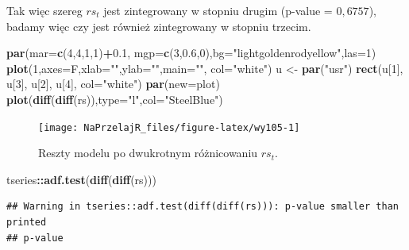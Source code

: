 \documentclass[polish,]{book}
\newenvironment{Shaded}{\begin{snugshade}}{\end{snugshade}}
\newcommand{\DataTypeTok}[1]{\textcolor[rgb]{0.13,0.29,0.53}{#1}}
\newcommand{\DecValTok}[1]{\textcolor[rgb]{0.00,0.00,0.81}{#1}}
\newcommand{\FloatTok}[1]{\textcolor[rgb]{0.00,0.00,0.81}{#1}}
\newcommand{\KeywordTok}[1]{\textcolor[rgb]{0.13,0.29,0.53}{\textbf{#1}}}
\newcommand{\NormalTok}[1]{#1}
\newcommand{\OperatorTok}[1]{\textcolor[rgb]{0.81,0.36,0.00}{\textbf{#1}}}
\newcommand{\StringTok}[1]{\textcolor[rgb]{0.31,0.60,0.02}{#1}}
\begin{document}
Tak więc szereg \(rs_t\) jest zintegrowany w stopniu drugim (p-value = \(0,6757\)), badamy więc czy jest również zintegrowany w stopniu trzecim.

\begin{Shaded}
\begin{Highlighting}[]
\KeywordTok{par}\NormalTok{(}\DataTypeTok{mar=}\KeywordTok{c}\NormalTok{(}\DecValTok{4}\NormalTok{,}\DecValTok{4}\NormalTok{,}\DecValTok{1}\NormalTok{,}\DecValTok{1}\NormalTok{)}\OperatorTok{+}\FloatTok{0.1}\NormalTok{, }\DataTypeTok{mgp=}\KeywordTok{c}\NormalTok{(}\DecValTok{3}\NormalTok{,}\FloatTok{0.6}\NormalTok{,}\DecValTok{0}\NormalTok{),}\DataTypeTok{bg=}\StringTok{"lightgoldenrodyellow"}\NormalTok{,}\DataTypeTok{las=}\DecValTok{1}\NormalTok{)}
\KeywordTok{plot}\NormalTok{(}\DecValTok{1}\NormalTok{,}\DataTypeTok{axes=}\NormalTok{F,}\DataTypeTok{xlab=}\StringTok{""}\NormalTok{,}\DataTypeTok{ylab=}\StringTok{""}\NormalTok{,}\DataTypeTok{main=}\StringTok{""}\NormalTok{, }\DataTypeTok{col=}\StringTok{"white"}\NormalTok{)}
\NormalTok{u <-}\StringTok{ }\KeywordTok{par}\NormalTok{(}\StringTok{"usr"}\NormalTok{)}
\KeywordTok{rect}\NormalTok{(u[}\DecValTok{1}\NormalTok{], u[}\DecValTok{3}\NormalTok{], u[}\DecValTok{2}\NormalTok{], u[}\DecValTok{4}\NormalTok{], }\DataTypeTok{col=}\StringTok{"white"}\NormalTok{)}
\KeywordTok{par}\NormalTok{(}\DataTypeTok{new=}\NormalTok{plot)}
\KeywordTok{plot}\NormalTok{(}\KeywordTok{diff}\NormalTok{(}\KeywordTok{diff}\NormalTok{(rs)),}\DataTypeTok{type=}\StringTok{"l"}\NormalTok{,}\DataTypeTok{col=}\StringTok{"SteelBlue"}\NormalTok{)}
\end{Highlighting}
\end{Shaded}

\begin{figure}[h]

{\centering \texttt{[image: NaPrzelajR\_files/figure-latex/wy105-1]} 

}

\caption{Reszty modelu po dwukrotnym różnicowaniu $rs_t$.}\label{fig:wy105}
\end{figure}

\begin{Shaded}
\begin{Highlighting}[]
\NormalTok{tseries}\OperatorTok{::}\KeywordTok{adf.test}\NormalTok{(}\KeywordTok{diff}\NormalTok{(}\KeywordTok{diff}\NormalTok{(rs)))}
\end{Highlighting}
\end{Shaded}

\begin{verbatim}
## Warning in tseries::adf.test(diff(diff(rs))): p-value smaller than printed
## p-value
\end{verbatim}
\end{document}
